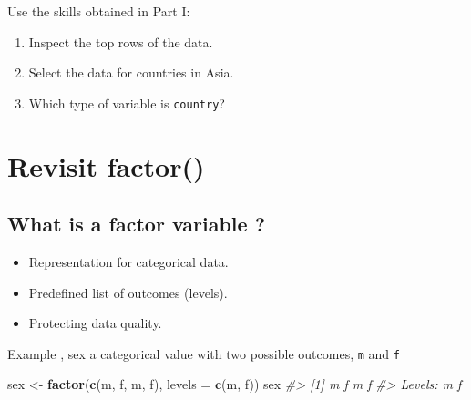 \documentclass[
]{book}
\newenvironment{Shaded}{\begin{snugshade}}{\end{snugshade}}
\newcommand{\AttributeTok}[1]{\textcolor[rgb]{0.13,0.29,0.53}{#1}}
\newcommand{\CommentTok}[1]{\textcolor[rgb]{0.56,0.35,0.01}{\textit{#1}}}
\newcommand{\FunctionTok}[1]{\textcolor[rgb]{0.13,0.29,0.53}{\textbf{#1}}}
\newcommand{\NormalTok}[1]{#1}
\newcommand{\OtherTok}[1]{\textcolor[rgb]{0.56,0.35,0.01}{#1}}
\newcommand{\StringTok}[1]{\textcolor[rgb]{0.31,0.60,0.02}{#1}}
\providecommand{\tightlist}{%
  \setlength{\itemsep}{0pt}\setlength{\parskip}{0pt}}
\begin{document}
Use the skills obtained in Part I:

\begin{enumerate}
\def\labelenumi{\arabic{enumi}.}
\tightlist
\item
  Inspect the top rows of the data.
\item
  Select the data for countries in Asia.
\item
  Which type of variable is \texttt{country}?
\end{enumerate}

\section*{Revisit factor()}\label{revisit-factor}

\subsection*{What is a factor variable ?}\label{what-is-a-factor-variable}

\begin{itemize}
\tightlist
\item
  Representation for categorical data.
\item
  Predefined list of outcomes (levels).
\item
  Protecting data quality.
\end{itemize}

Example , sex a categorical value with two possible outcomes, \texttt{m} and
\texttt{f}

\begin{Shaded}
\begin{Highlighting}[]
\NormalTok{sex }\OtherTok{\textless{}{-}} \FunctionTok{factor}\NormalTok{(}\FunctionTok{c}\NormalTok{(}\StringTok{\textquotesingle{}m\textquotesingle{}}\NormalTok{, }\StringTok{\textquotesingle{}f\textquotesingle{}}\NormalTok{, }\StringTok{\textquotesingle{}m\textquotesingle{}}\NormalTok{, }\StringTok{\textquotesingle{}f\textquotesingle{}}\NormalTok{),}
              \AttributeTok{levels =} \FunctionTok{c}\NormalTok{(}\StringTok{\textquotesingle{}m\textquotesingle{}}\NormalTok{, }\StringTok{\textquotesingle{}f\textquotesingle{}}\NormalTok{))}
\NormalTok{sex}
\CommentTok{\#\textgreater{} [1] m f m f}
\CommentTok{\#\textgreater{} Levels: m f}
\end{Highlighting}
\end{Shaded}
\end{document}
